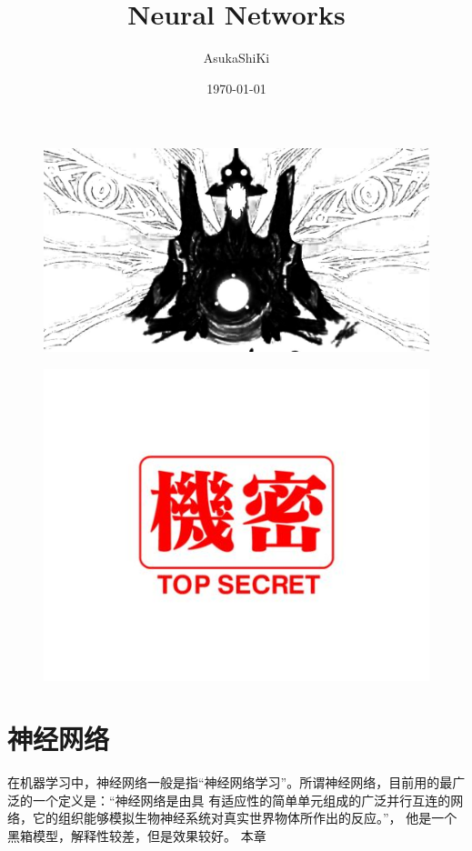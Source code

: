 \documentclass[UTF8]{ctexart}
\title{Neural Networks}
\author{AsukaShiKi}
\date{\today}
\begin{document}
\maketitle
\par
\begin{figure}[ht]
    \centering
    \includegraphics[scale=0.4]{01.jpg}
\end{figure}
\begin{figure}[ht]
    \centering
    \includegraphics[scale=0.3]{02.jpg}
\end{figure}
\newpage
\tableofcontents
\newpage
\Large{
\section{神经网络}
在机器学习中，神经网络一般是指“神经网络学习”。所谓神经网络，目前用的最广泛的一个定义是：“神经网络是由具
有适应性的简单单元组成的广泛并行互连的网络，它的组织能够模拟生物神经系统对真实世界物体所作出的反应。”，
他是一个黑箱模型，解释性较差，但是效果较好。
本章
}
\end{document}
